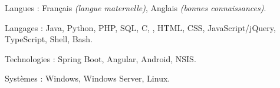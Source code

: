 \begin{indentsection}{\parindent}
\begin{description*}
  \item[Langues :]
  Français \emph{(langue maternelle)}, %
  Anglais \emph{(bonnes connaissances)}.
  \item[Langages :] Java, Python, PHP, SQL, C, \Csharp, HTML,
  CSS, JavaScript/jQuery, TypeScript, Shell, Bash.
  \item[Technologies :] Spring Boot, Angular, Android, NSIS.
  \item[Systèmes :] Windows, Windows Server, Linux.
\end{description*}
\end{indentsection}
